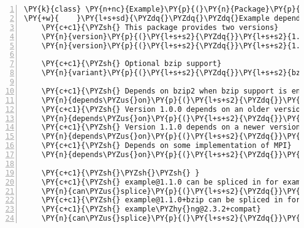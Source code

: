 \begin{Verbatim}[commandchars=\\\{\},numbers=left,xleftmargin=5mm,fontsize=\footnotesize]
\PY{k}{class} \PY{n+nc}{Example}\PY{p}{(}\PY{n}{Package}\PY{p}{)}\PY{p}{:}
\PY{+w}{    }\PY{l+s+sd}{\PYZdq{}\PYZdq{}\PYZdq{}Example depends on zlib, mpi and optionally bzip2\PYZdq{}\PYZdq{}\PYZdq{}}
    \PY{c+c1}{\PYZsh{} This package provides two versions}
    \PY{n}{version}\PY{p}{(}\PY{l+s+s2}{\PYZdq{}}\PY{l+s+s2}{1.1.0}\PY{l+s+s2}{\PYZdq{}}\PY{p}{)}
    \PY{n}{version}\PY{p}{(}\PY{l+s+s2}{\PYZdq{}}\PY{l+s+s2}{1.0.0}\PY{l+s+s2}{\PYZdq{}}\PY{p}{)}

    \PY{c+c1}{\PYZsh{} Optional bzip support}
    \PY{n}{variant}\PY{p}{(}\PY{l+s+s2}{\PYZdq{}}\PY{l+s+s2}{bzip}\PY{l+s+s2}{\PYZdq{}}\PY{p}{,} \PY{n}{default}\PY{o}{=}\PY{k+kc}{True}\PY{p}{)}

    \PY{c+c1}{\PYZsh{} Depends on bzip2 when bzip support is enabled}
    \PY{n}{depends\PYZus{}on}\PY{p}{(}\PY{l+s+s2}{\PYZdq{}}\PY{l+s+s2}{bzip2}\PY{l+s+s2}{\PYZdq{}}\PY{p}{,} \PY{n}{when}\PY{o}{=}\PY{l+s+s2}{\PYZdq{}}\PY{l+s+s2}{+bzip}\PY{l+s+s2}{\PYZdq{}}\PY{p}{)}
    \PY{c+c1}{\PYZsh{} Version 1.0.0 depends on an older version of zlib}
    \PY{n}{depends\PYZus{}on}\PY{p}{(}\PY{l+s+s2}{\PYZdq{}}\PY{l+s+s2}{zlib@1.2}\PY{l+s+s2}{\PYZdq{}} \PY{n}{when}\PY{o}{=}\PY{l+s+s2}{\PYZdq{}}\PY{l+s+s2}{@1.0.0}\PY{l+s+s2}{\PYZdq{}}\PY{p}{)}
    \PY{c+c1}{\PYZsh{} Version 1.1.0 depends on a newer version of zlib}
    \PY{n}{depends\PYZus{}on}\PY{p}{(}\PY{l+s+s2}{\PYZdq{}}\PY{l+s+s2}{zlib@1.3}\PY{l+s+s2}{\PYZdq{}}\PY{p}{,} \PY{n}{when}\PY{o}{=}\PY{l+s+s2}{\PYZdq{}}\PY{l+s+s2}{@1.1.0}\PY{l+s+s2}{\PYZdq{}}\PY{p}{)}
    \PY{c+c1}{\PYZsh{} Depends on some implementation of MPI}
    \PY{n}{depends\PYZus{}on}\PY{p}{(}\PY{l+s+s2}{\PYZdq{}}\PY{l+s+s2}{mpi}\PY{l+s+s2}{\PYZdq{}}\PY{p}{)}

    \PY{c+c1}{\PYZsh{}\PYZsh{}\PYZsh{} }
    \PY{c+c1}{\PYZsh{} example@1.1.0 can be spliced in for example@1.0.0}
    \PY{n}{can\PYZus{}splice}\PY{p}{(}\PY{l+s+s2}{\PYZdq{}}\PY{l+s+s2}{example@1.0.0}\PY{l+s+s2}{\PYZdq{}}\PY{p}{,} \PY{n}{when}\PY{o}{=}\PY{l+s+s2}{\PYZdq{}}\PY{l+s+s2}{@1.1.0}\PY{l+s+s2}{\PYZdq{}}\PY{p}{)}
    \PY{c+c1}{\PYZsh{} example@1.1.0+bzip can be spliced in for}
    \PY{c+c1}{\PYZsh{} example\PYZhy{}ng@2.3.2+compat}
    \PY{n}{can\PYZus{}splice}\PY{p}{(}\PY{l+s+s2}{\PYZdq{}}\PY{l+s+s2}{example\PYZhy{}ng@2.3.2+compat}\PY{l+s+s2}{\PYZdq{}}\PY{p}{,} \PY{n}{when}\PY{o}{=}\PY{l+s+s2}{\PYZdq{}}\PY{l+s+s2}{@1.1.0+bzip}\PY{l+s+s2}{\PYZdq{}}\PY{p}{)}
\end{Verbatim}
